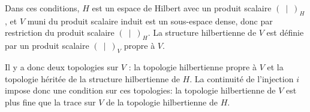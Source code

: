 \medskip
Dans ces conditions, \(H\) est un espace de Hilbert avec un produit scalaire \((\ \mid\ )_H\),
et \(V\) muni du produit scalaire induit est un sous-espace dense, donc
 par restriction du produit
scalaire \((\ \mid\ )_H\).
La structure hilbertienne de \(V\) est définie par un produit scalaire \((\ \mid\ )_V\) propre à \(V\).

\medskip
Il y a donc deux topologies sur \(V\) : la topologie hilbertienne propre à \(V\) et la
topologie héritée de la structure hilbertienne de \(H\).
La continuité de l'injection \(i\) impose donc une condition sur ces topologies:
la topologie hilbertienne de \(V\) est plus fine que la trace sur \(V\) de la topologie hilbertienne de \(H\).

\medskip
{} 